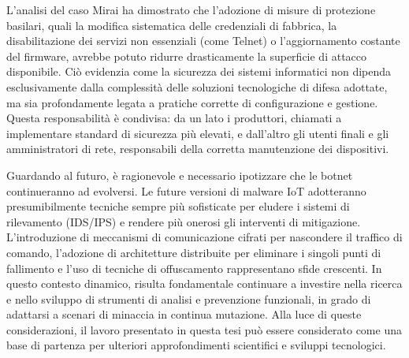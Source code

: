 L'analisi del caso Mirai ha dimostrato che l’adozione di misure di protezione basilari, quali la modifica sistematica delle credenziali di fabbrica, la disabilitazione dei servizi non essenziali (come Telnet) o l’aggiornamento costante del firmware, avrebbe potuto ridurre drasticamente la superficie di attacco disponibile. Ciò evidenzia come la sicurezza dei sistemi informatici non dipenda esclusivamente dalla complessità delle soluzioni tecnologiche di difesa adottate, ma sia profondamente legata a pratiche corrette di configurazione e gestione. Questa responsabilità è condivisa: da un lato i produttori, chiamati a implementare standard di sicurezza più elevati, e dall'altro gli utenti finali e gli amministratori di rete, responsabili della corretta manutenzione dei dispositivi.

Guardando al futuro, è ragionevole e necessario ipotizzare che le botnet continueranno ad evolversi. Le future versioni di malware IoT adotteranno presumibilmente tecniche sempre più sofisticate per eludere i sistemi di rilevamento (IDS/IPS) e rendere più onerosi gli interventi di mitigazione. L’introduzione di meccanismi di comunicazione cifrati per nascondere il traffico di comando, l'adozione di architetture distribuite per eliminare i singoli punti di fallimento e l'uso di tecniche di offuscamento rappresentano sfide crescenti. In questo contesto dinamico, risulta fondamentale continuare a investire nella ricerca e nello sviluppo di strumenti di analisi e prevenzione funzionali, in grado di adattarsi a scenari di minaccia in continua mutazione. Alla luce di queste considerazioni, il lavoro presentato in questa tesi può essere considerato come una base di partenza per ulteriori approfondimenti scientifici e sviluppi tecnologici. 

